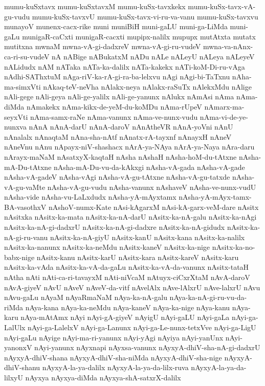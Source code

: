{mumu-kuSxtavx
mumu-kuSxtavxM
mumu-kuSx-tavxkekx
mumu-kuSx-tavx-vA-gu-vudu
mumu-kuSx-tavxvU
mumu-kuSx-tavx-vi-ru-va-vanu
mumu-kuSx-tavxvu
munayoV
munenx-cacx-rike
muni
muniBiH
muni-gaLU
muni-ga-LiMda
muni-gaLu
munigaR-caCxti
munigaR-cacxti
mupipx-nalilx
mupupx
mutAtxta
mutatx
mutitxna
mwnaM
mwna-vA-gi-dadxreV
mwna-vA-gi-ru-vudeV
mwna-va-nAnx-ca-ri-su-vudeV
nA
nABige
nABukatxM
nADu
nALe
nALeyU
nALeya
nALeyeV
nALidudx
nAM
nATaka
nATa-ka-dalilx
nATa-kakekx
nATi-koM-Di-ru-vAga
nAdhi-SAThxtuM
nAga-riV-ka-rA-gi-ra-ba-lelxvu
nAgi
nAgi-bi-TaTxnu
nAha-ma-simxVti
nAkaq-teV-neVha
nAlakx-neya
nAlakx-raSuTx
nAlekxMdu
nAlige
nAli-gege
nAli-geya
nAli-ge-yalilx
nAli-ge-yanunx
nAlukx
nAmAsi
nAma
nAma-diMda
nAmakekx
nAma-kikx-de-yeM-du-koMDu
nAma-rUpeV
nAmarx-ma-seyxVti
nAma-samx-raNe
nAma-vanunx
nAma-ve-nunx-vudu
nAma-vi-de-ye-nunxva
nAnA
nAnA-darU
nAnA-daroV
nAnAtheVR
nAnA-yoVni
nAnU
nAnalalx
nAnaqtaM
nAna-sha-nAtf
nAnatx-rA-tayxnf
nAnayxH
nAneV
nAneVnu
nAnu
nApayx-niV-shashacx
nArA-ya-NAya
nArA-ya-Naya
nAra-daru
nArayx-maNaM
nAsatxyX-kaqtaH
nAsha
nAshaH
nAsha-hoM-du-tAtxne
nAsha-mA-Du-tAtxne
nAsha-mA-Du-vu-da-kAkxgi
nAsha-vA-gada
nAsha-vA-gade
nAsha-vA-gadeV
nAsha-vAgi
nAsha-vA-gu-tAtxne
nAsha-vA-gu-tatxde
nAsha-vA-gu-vaMte
nAsha-vA-gu-vudu
nAsha-vanunx
nAshaveV
nAsha-ve-nunx-vudU
nAsha-vide
nAsha-vu-LaLxdudx
nAsha-yA-mAyxtamx
nAsha-yA-mAyx-tamx-BA-vasothxV
nAshoV-numx-Kate
nAsi-kAgarxM
nAsi-kA-garx-veM-dare
nAsitx
nAsitxka
nAsitx-ka-mata
nAsitx-ka-nA-darU
nAsitx-ka-nA-galu
nAsitx-ka-nAgi
nAsitx-ka-nA-gi-dadxrU
nAsitx-ka-nA-gi-dadxre
nAsitx-ka-nA-gidudx
nAsitx-ka-nA-gi-ru-vanu
nAsitx-ka-nA-giyU
nAsitx-kanU
nAsitx-kana
nAsitx-ka-nalilx
nAsitx-ka-nanunx
nAsitx-ka-neMdu
nAsitx-kaneV
nAsitx-ka-nige
nAsitx-ka-no-babx-nige
nAsitx-kanu
nAsitx-karU
nAsitx-kara
nAsitx-kareV
nAsitx-karu
nAsitx-ka-vAda
nAsitx-ka-vA-da-gaLu
nAsitx-ka-vA-da-vanunx
nAsitx-tataH
nAtha
nAti
nAti-ca-ri-tavayxM
nAti-niVcaM
nAtuyx-ciCxrXtaM
nAvA-daroV
nAvA-giyeV
nAvU
nAveV
nAveV-da-vitf
nAvelAlx
nAve-lAlxrU
nAve-lalxrU
nAvu
nAvu-gaLu
nAyaM
nAyaRmaNaM
nAya-ka-nA-galu
nAya-ka-nA-gi-ru-vu-da-riMda
nAya-kana
nAya-ka-neMdu
nAya-kaneV
nAya-ka-nige
nAya-kanu
nAya-karu
nAya-mAtAmx
nAyi
nAyi-gA-giyeV
nAyigU
nAyi-gaLU
nAyi-gaLa
nAyi-ga-LalUlx
nAyi-ga-LalelxV
nAyi-ga-Lanunx
nAyi-ga-Le-nunx-tetxVve
nAyi-ga-LigU
nAyi-gaLu
nAyige
nAyi-ma-ri-yanunx
nAyi-yAgi
nAyiya
nAyi-yanUnx
nAyi-yanonxV
nAyi-yanunx
nAyxnapi
nAyxsa-vanunx
nAyxyA-dhiV-sha-nA-gi-dadxrU
nAyxyA-dhiV-shana
nAyxyA-dhiV-sha-niMda
nAyxyA-dhiV-sha-nige
nAyxyA-dhiV-shanu
nAyxyA-la-ya-dalilx
nAyxyA-la-ya-da-lilx-ruva
nAyxyA-la-ya-da-lilxyU
nAyxya
nAyxya-diMda
nAyxya-shA-satxrX-dalilx
}
